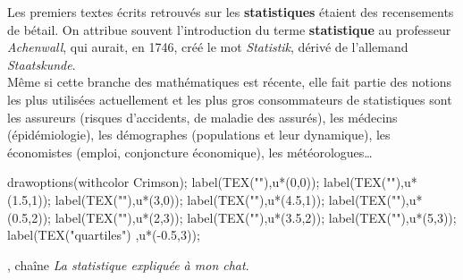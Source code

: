 \vspace*{-8mm}

\vspace*{-4mm}

\begin{debat}
    \begin{changemargin}{-10mm}{-20mm}
        \vspace*{-3mm}
    Les premiers textes écrits retrouvés sur les {\bf statistiques} étaient des recensements de bétail. On attribue souvent l'introduction du terme {\bf statistique} au professeur {\it Achenwall}, qui aurait, en 1746, créé le mot {\it Statistik}, dérivé de l'allemand {\it Staatskunde}. \\
    Même si cette branche des mathématiques est récente, elle fait partie des notions les plus utilisées actuellement et les plus gros consommateurs de statistiques sont les assureurs (risques d'accidents, de maladie des assurés), les médecins (épidémiologie), les démographes (populations et leur dynamique), les économistes (emploi, conjoncture économique), les météorologues\dots
    \vspace*{-5mm}
    \begin{center}
       \begin{Geometrie}[CoinBG={(-u,-u)}]
            drawoptions(withcolor Crimson);
            label(TEX(""),u*(0,0));
            label(TEX(""),u*(1.5,1));
            label(TEX(""),u*(3,0));
            label(TEX(""),u*(4.5,1));
            label(TEX(""),u*(0.5,2));
            label(TEX(""),u*(2,3));
            label(TEX(""),u*(3.5,2));
            label(TEX(""),u*(5,3));
            label(TEX("\small quartiles") ,u*(-0.5,3));
       \end{Geometrie}
    \end{center}
    \begin{cadre}[B2][J4]
       \begin{center}
          , chaîne {\it La statistique expliquée à mon chat}.
       \end{center}
    \end{cadre}
    \end{changemargin}
 \end{debat}
